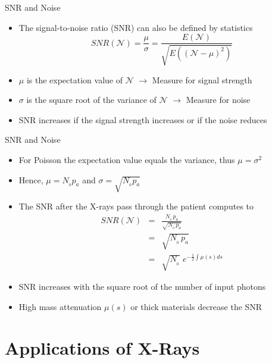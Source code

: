 \begin{frame}{SNR and Noise}
    \begin{itemize}
        \item The signal-to-noise ratio (SNR) can also be defined by statistics
              \begin{equation*}
                  SNR(\mathcal{N}) =  \frac{\mu}{\sigma} = \frac{E(\mathcal{N})}{\sqrt{E((\mathcal{N}-\mu)^2)}}
              \end{equation*}
        \item $\mu$ is the expectation value of $\mathcal{N}$ $\rightarrow$ Measure for signal strength
        \item $\sigma$ is the square root of the variance of $\mathcal{N}$ $\rightarrow$ Measure for noise
        \item SNR increases if the signal strength increases or if the noise reduces
    \end{itemize}
\end{frame}

\begin{frame}{SNR and Noise}
    \begin{itemize}
        \item For Poisson the expectation value equals the variance, thus $\mu = \sigma^2$
        \item Hence, $\mu = N_{_0} p_a$ and $\sigma = \sqrt{N_{_0} p_a}$
        \item The SNR after the X-rays pass through the patient computes to
              \vspace{0.25cm}
              \begin{eqnarray}
                  SNR(\mathcal{N}) &=& \frac{N_{_0}\,p_a}{\sqrt{N_{_0}\,p_a}} \nonumber\\[0.25cm]
                  &=& \sqrt{N_{_0} \,p_a} \nonumber\\[0.25cm]
                  &=& \sqrt{N_{_0}} \,\, e^{-\frac{1}{2}\int \mu(s) ds} \nonumber
              \end{eqnarray}
        \item SNR increases with the square root of the number of input photons
        \item High mass attenuation $\mu(s)$ or thick materials decrease the SNR
    \end{itemize}
\end{frame}

\section{Applications of X-Rays}

